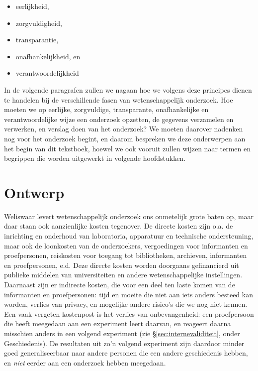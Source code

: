 \documentclass[
]{book}
\begin{document}
\begin{itemize}
\item
  eerlijkheid,
\item
  zorgvuldigheid,
\item
  transparantie,
\item
  onafhankelijkheid, en
\item
  verantwoordelijkheid
\end{itemize}

In de volgende paragrafen zullen we nagaan hoe we volgens deze principes
dienen te handelen bij de verschillende fasen van wetenschappelijk
onderzoek. Hoe moeten we op eerlijke, zorgvuldige, transparante,
onafhankelijke en verantwoordelijke wijze een onderzoek opzetten, de
gegevens verzamelen en verwerken, en verslag doen van het onderzoek? We
moeten daarover nadenken nog voor het onderzoek begint, en daarom
bespreken we deze onderwerpen aan het begin van dit tekstboek, hoewel we
ook vooruit zullen wijzen naar termen en begrippen die worden uitgewerkt
in volgende hoofdstukken.

\hypertarget{sec:ontwerp}{%
\section{Ontwerp}\label{sec:ontwerp}}

Weliswaar levert wetenschappelijk onderzoek ons onmetelijk grote baten
op, maar daar staan ook aanzienlijke kosten tegenover. De directe kosten
zijn o.a. de inrichting en onderhoud van laboratoria, apparatuur en
technische ondersteuning, maar ook de loonkosten van de onderzoekers,
vergoedingen voor informanten en proefpersonen, reiskosten voor toegang
tot bibliotheken, archieven, informanten en proefpersonen, e.d. Deze
directe kosten worden doorgaans gefinancierd uit publieke middelen van
universiteiten en andere wetenschappelijke instellingen. Daarnaast zijn
er indirecte kosten, die voor een deel ten laste komen van de
informanten en proefpersonen: tijd en moeite die niet aan iets anders
besteed kan worden, verlies van privacy, en mogelijke andere risico's
die we nog niet kennen. Een vaak vergeten kostenpost is het verlies van
onbevangenheid: een proefpersoon die heeft meegedaan aan een experiment
leert daarvan, en reageert daarna misschien anders in een volgend
experiment (zie
§\ref{sec:internevaliditeit}, onder Geschiedenis). De resultaten
uit zo'n volgend experiment zijn daardoor minder goed generaliseerbaar
naar andere personen die een andere geschiedenis hebben, en \emph{niet}
eerder aan een onderzoek hebben meegedaan.
\end{document}
